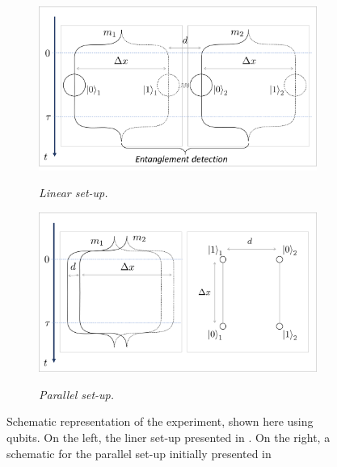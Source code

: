 \documentclass[%
 reprint,
 superscriptaddress,
 amsmath,
 amssymb,
 aps,
 longbibliography
]{revtex4-2}
\begin{document}
	\begin{figure}
	    \begin{subfigure}{.49\textwidth}
    		\includegraphics[width=1.0\columnwidth]{Picture1}\par\medskip
    		\textit{Linear set-up.\label{fig:QGEMlinear1}}\par\medskip
		\end{subfigure}
	    \begin{subfigure}{.49\textwidth}
    		\includegraphics[width=1.\columnwidth]{para_topdown.png}\par\medskip
    		\textit{Parallel set-up. \label{fig:QGEMpara1}}\par\medskip
		\end{subfigure}
		\caption{Schematic representation of the experiment, shown here using qubits. On the left, the liner set-up presented in \cite{Bose2017, Marletto2017, Kamp2020}. On the right, a schematic for the parallel set-up initially presented in \cite{Nguyen2019}}\par\medskip \label{fig:QGEMinit}
	\end{figure}
\end{document}
